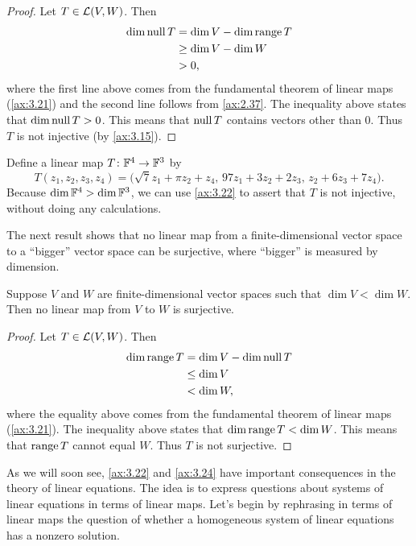 \begin{proof}
Let $T\in\mathcal{L}(V,W)$. Then
\begin{align*}
\operatorname{dim}\operatorname{null} T &= \operatorname{dim} V-\operatorname{dim}\operatorname{range} T\\
  &\ge \operatorname{dim} V-\operatorname{dim} W\\
  &> 0,
\end{align*}
where the first line above comes from the fundamental theorem of linear maps
(\ref{ax:3.21}) and the second line follows from \ref{ax:2.37}. The inequality
above states that $\operatorname{dim}\operatorname{null} T>0$. This means that $\operatorname{null} T$ contains vectors
other than $0$. Thus $T$ is not injective (by \ref{ax:3.15}).
\end{proof}

\begin{example}\label{ax:3.23}
Define a linear map $T\colon\mathbb{F}^4\to\mathbb{F}^3$ by
\[ T(z_1,z_2,z_3,z_4)=\bigl(\sqrt7z_1+\pi z_2+z_4,\,97z_1+3z_2+2z_3,\,
   z_2+6z_3+7z_4\bigr). \]
Because $\operatorname{dim}\mathbb{F}^4>\operatorname{dim}\mathbb{F}^3$, we can use \ref{ax:3.22} to assert that $T$ is
not injective, without doing any calculations.
\end{example}

The next result shows that no linear map from a finite-dimensional vector
space to a ``bigger'' vector space can be surjective, where ``bigger'' is
measured by dimension.

\begin{result}\label{ax:3.24}
Suppose $V$ and $W$ are finite-dimensional vector spaces such that
$\dim V<\dim W$. Then no linear map from $V$ to $W$ is surjective.
\end{result}

\begin{proof}
Let $T\in\mathcal{L}(V,W)$. Then
\begin{align*}
\operatorname{dim}\operatorname{range} T &= \operatorname{dim} V-\operatorname{dim}\operatorname{null} T\\
  &\le \operatorname{dim} V\\
  &< \operatorname{dim} W,
\end{align*}
where the equality above comes from the fundamental theorem of linear maps
(\ref{ax:3.21}). The inequality above states that $\operatorname{dim}\operatorname{range} T<\operatorname{dim} W$. This
means that $\operatorname{range} T$ cannot equal $W$. Thus $T$ is not surjective.
\end{proof}

As we will soon see, \ref{ax:3.22} and \ref{ax:3.24} have important
consequences in the theory of linear equations. The idea is to express
questions about systems of linear equations in terms of linear maps. Let's
begin by rephrasing in terms of linear maps the question of whether a
homogeneous system of linear equations has a nonzero solution.

